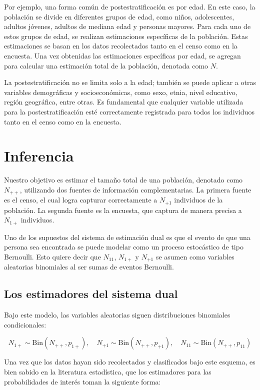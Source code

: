 \documentclass[
  12pt,
]{book}
\begin{document}
Por ejemplo, una forma común de postestratificación es por edad. En este caso, la población se divide en diferentes grupos de edad, como niños, adolescentes, adultos jóvenes, adultos de mediana edad y personas mayores. Para cada uno de estos grupos de edad, se realizan estimaciones específicas de la población. Estas estimaciones se basan en los datos recolectados tanto en el censo como en la encuesta. Una vez obtenidas las estimaciones específicas por edad, se agregan para calcular una estimación total de la población, denotada como \(N\).

La postestratificación no se limita solo a la edad; también se puede aplicar a otras variables demográficas y socioeconómicas, como sexo, etnia, nivel educativo, región geográfica, entre otras. Es fundamental que cualquier variable utilizada para la postestratificación esté correctamente registrada para todos los individuos tanto en el censo como en la encuesta.

\section{Inferencia}\label{inferencia}

Nuestro objetivo es estimar el tamaño total de una población, denotado como \(N_{++}\), utilizando dos fuentes de información complementarias. La primera fuente es el censo, el cual logra capturar correctamente a \(N_{+1}\) individuos de la población. La segunda fuente es la encuesta, que captura de manera precisa a \(N_{1+}\) individuos.

Uno de los supuestos del sistema de estimación dual es que el evento de que una persona sea encontrada se puede modelar como un proceso estocástico de tipo Bernoulli. Esto quiere decir que \(N_{11}\), \(N_{1+}\) y \(N_{+1}\) se asumen como variables aleatorias binomiales al ser sumas de eventos Bernoulli.

\subsection{Los estimadores del sistema dual}\label{los-estimadores-del-sistema-dual}

Bajo este modelo, las variables aleatorias siguen distribuciones binomiales condicionales:

\[
N_{1+} \sim \text{Bin}(N_{++}, p_{1+}), \quad N_{+1} \sim \text{Bin}(N_{++}, p_{+1}), \quad N_{11} \sim \text{Bin}(N_{++}, p_{11})
\]

Una vez que los datos hayan sido recolectados y clasificados bajo este esquema, es bien sabido en la literatura estadística, que los estimadores para las probabilidades de interés toman la siguiente forma:
\end{document}
